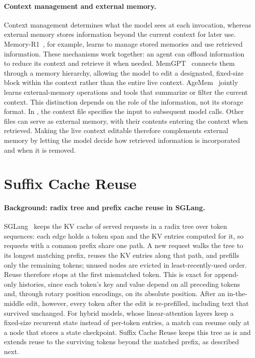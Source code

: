 \paragraph{Context management and external memory.}
Context management determines what the model sees at each invocation, whereas external memory stores information beyond the current context for later use. Memory-R1~\citep{yan2026memory}, for example, learns to manage stored memories and use retrieved information. These mechanisms work together: an agent can offload information to reduce its context and retrieve it when needed. MemGPT~\citep{packer2023memgpt} connects them through a memory hierarchy, allowing the model to edit a designated, fixed-size block within the context rather than the entire live context. AgeMem~\citep{yu2026agentic} jointly learns external-memory operations and tools that summarize or filter the current context.
This distinction depends on the role of the information, not its storage format. In \oursplural{}, the context file specifies the input to subsequent model calls. Other files can serve as external memory, with their contents entering the context when retrieved. Making the live context editable therefore complements external memory by letting the model decide how retrieved information is incorporated and when it is removed.

\section{Suffix Cache Reuse}
\label{app:scr}

\paragraph{Background: radix tree and prefix cache reuse in SGLang.}
SGLang~\citep{zheng2024sglang} keeps the KV cache of served requests in a radix tree over token sequences: each edge holds a token span and the KV entries computed for it, so requests with a common prefix share one path. A new request walks the tree to its longest matching prefix, reuses the KV entries along that path, and prefills only the remaining tokens; unused nodes are evicted in least-recently-used order. Reuse therefore stops at the first mismatched token. This is exact for append-only histories, since each token's key and value depend on all preceding tokens and, through rotary position encodings, on its absolute position. After an in-the-middle edit, however, every token after the edit is re-prefilled, including text that survived unchanged. For hybrid models, whose linear-attention layers keep a fixed-size recurrent state instead of per-token entries, a match can resume only at a node that stores a state checkpoint. Suffix Cache Reuse keeps this tree as is and extends reuse to the surviving tokens beyond the matched prefix, as described next.


